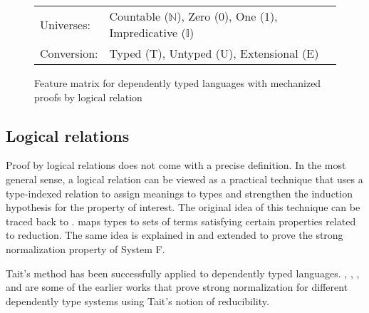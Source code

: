 \documentclass[acmsmall,screen=true,
\ifpublic review=false\else,review=true\fi
  ,anonymous=\ifanonymous true\else false\fi]{acmart}
\newcommand{\scw}[1]{}
\newcommand{\yl}[1]{}
\begin{document}
\begin{figure}[h]
\begin{tabular}{ll}
  \\
  Universes: &Countable ($\mathbb{N}$), Zero (0), One (1), Impredicative ($\mathbb{I}$) \\
  Conversion:& Typed (T), Untyped (U), Extensional (E) \\
  \end{tabular}

  \caption{Feature matrix for dependently typed languages with
    mechanized proofs by logical relation}
  \label{fig:featurematrix}
\end{figure}


\subsection{Logical relations}
Proof by logical relations does not come with a precise definition. In
the most general sense, a logical relation can be viewed as a
practical technique that uses a type-indexed relation to assign
meanings to types and strengthen the induction hypothesis for the
property of interest. The original idea of this technique can be
traced back to
\citet{tait1967:reducibility}. \citet{tait1967:reducibility} maps
types to sets of terms satisfying certain properties related to reduction.
The same idea is explained in \citet{girard1989proofs} and extended to
prove the strong normalization property of System F.

Tait's method has been successfully applied to dependently typed
languages.  \citet{Martin-Lof-1973}, \citet{luo1990extended},
\citet{geuvers1994short}, and
\citet{barendregt:lambda-calculi-with-types} are some of the earlier
works that prove strong
normalization for different dependently type systems using Tait's notion of
reducibility.

\scw{Should give Martin L\"of credit for first consistency proof.}

\end{document}
